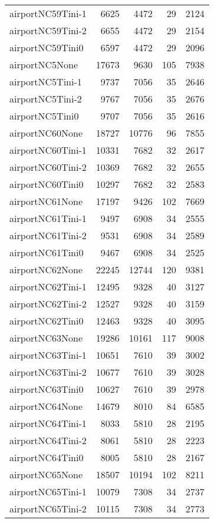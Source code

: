 \begin{longtable}{lrrrr}
airportNC59Tini-1 & 6625 & 4472 & 29 & 2124 \\
airportNC59Tini-2 & 6655 & 4472 & 29 & 2154 \\
airportNC59Tini0 & 6597 & 4472 & 29 & 2096 \\
airportNC5None & 17673 & 9630 & 105 & 7938 \\
airportNC5Tini-1 & 9737 & 7056 & 35 & 2646 \\
airportNC5Tini-2 & 9767 & 7056 & 35 & 2676 \\
airportNC5Tini0 & 9707 & 7056 & 35 & 2616 \\
airportNC60None & 18727 & 10776 & 96 & 7855 \\
airportNC60Tini-1 & 10331 & 7682 & 32 & 2617 \\
airportNC60Tini-2 & 10369 & 7682 & 32 & 2655 \\
airportNC60Tini0 & 10297 & 7682 & 32 & 2583 \\
airportNC61None & 17197 & 9426 & 102 & 7669 \\
airportNC61Tini-1 & 9497 & 6908 & 34 & 2555 \\
airportNC61Tini-2 & 9531 & 6908 & 34 & 2589 \\
airportNC61Tini0 & 9467 & 6908 & 34 & 2525 \\
airportNC62None & 22245 & 12744 & 120 & 9381 \\
airportNC62Tini-1 & 12495 & 9328 & 40 & 3127 \\
airportNC62Tini-2 & 12527 & 9328 & 40 & 3159 \\
airportNC62Tini0 & 12463 & 9328 & 40 & 3095 \\
airportNC63None & 19286 & 10161 & 117 & 9008 \\
airportNC63Tini-1 & 10651 & 7610 & 39 & 3002 \\
airportNC63Tini-2 & 10677 & 7610 & 39 & 3028 \\
airportNC63Tini0 & 10627 & 7610 & 39 & 2978 \\
airportNC64None & 14679 & 8010 & 84 & 6585 \\
airportNC64Tini-1 & 8033 & 5810 & 28 & 2195 \\
airportNC64Tini-2 & 8061 & 5810 & 28 & 2223 \\
airportNC64Tini0 & 8005 & 5810 & 28 & 2167 \\
airportNC65None & 18507 & 10194 & 102 & 8211 \\
airportNC65Tini-1 & 10079 & 7308 & 34 & 2737 \\
airportNC65Tini-2 & 10115 & 7308 & 34 & 2773 \\

\end{longtable}
